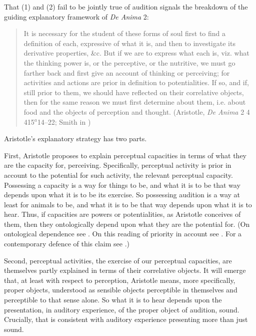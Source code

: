 That (1) and (2) fail to be jointly true of audition signals the breakdown of the guiding explanatory framework of \emph{De Anima} 2:
\begin{quote}
	It is necessary for the student of these forms of soul first to find a definition of each, expressive of what it is, and then to investigate its derivative properties, \&c. But if we are to express what each is, viz. what the thinking power is, or the perceptive, or the nutritive, we must go farther back and first give an account of thinking or perceiving; for activities and actions are prior in definition to potentialities. If so, and if, still prior to them, we should have reflected on their correlative objects, then for the same reason we must first determine about them, i.e. about food and the objects of perception and thought. (Aristotle, \emph{De Anima} 2 4 415\( ^{a} \)14--22; Smith in \citealt[26]{Barnes:1984uq})
\end{quote}
Aristotle's explanatory strategy has two parts. 

First, Aristotle proposes to explain perceptual capacities in terms of what they are the capacity for, perceiving.  Specifically, perceptual activity is prior in account to the potential for such activity, the relevant perceptual capacity. Possessing a capacity is a way for things to be, and what it is to be that way depends upon what it is to be its exercise. So possessing audition is a way at least for animals to be, and what it is to be that way depends upon what it is to hear. Thus, if capacities are powers or potentialities, as Aristotle conceives of them, then they ontologically depend upon what they are the potential for. (On ontological dependence see \citealt{Fine:1995ls}. On this reading of priority in account see \citealt{Peramatzis:2011aa}. For a contemporary defence of this claim see \citealt{Kalderon:2012fk}.) 

Second, perceptual activities, the exercise of our perceptual capacities, are themselves partly explained in terms of their correlative objects. It will emerge that, at least with respect to perception, Aristotle means, more specifically, proper objects, understood as sensible objects perceptible in themselves and perceptible to that sense alone. So what it is to hear depends upon the presentation, in auditory experience, of the proper object of audition, sound. Crucially, that is consistent with auditory experience presenting more than just sound.

